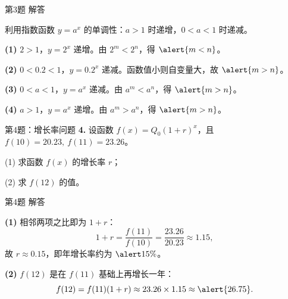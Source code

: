 \documentclass[10pt,aspectratio=169,serif,fleqn]{beamer}
\begin{document}
\begin{frame}[t]{第3题 解答}
\begin{tcolorbox}[colback=orange!10,colframe=orange,title=\textbf{解}]
利用指数函数 $y=a^{x}$ 的单调性：$a>1$ 时递增，$0<a<1$ 时递减。

\vspace{0.4em}
\textbf{(1)} $2>1$，$y=2^{x}$ 递增。由 $2^{m}<2^{n}$，得 $\alert{m<n}$。

\vspace{0.4em}
\textbf{(2)} $0<0.2<1$，$y=0.2^{x}$ 递减。函数值小则自变量大，故 $\alert{m>n}$。

\vspace{0.4em}
\textbf{(3)} $0<a<1$，$y=a^{x}$ 递减。由 $a^{m}<a^{n}$，得 $\alert{m>n}$。

\vspace{0.4em}
\textbf{(4)} $a>1$，$y=a^{x}$ 递增。由 $a^{m}>a^{n}$，得 $\alert{m>n}$。
\end{tcolorbox}
\end{frame}

\begin{frame}[t]{第4题：增长率问题}
\textbf{4.} 设函数 $f(x)=Q_{0}(1+r)^{x}$，且 $f(10)=20.23,\ f(11)=23.26$。

(1) 求函数 $f(x)$ 的增长率 $r$；

(2) 求 $f(12)$ 的值。
\end{frame}

\begin{frame}[t]{第4题 解答}
\begin{tcolorbox}[colback=orange!10,colframe=orange,title=\textbf{解}]
\textbf{(1)} 相邻两项之比即为 $1+r$：
\[
1+r=\frac{f(11)}{f(10)}=\frac{23.26}{20.23}\approx 1.15,
\]
故 $r\approx 0.15$，即年增长率约为 $\alert{15\%}$。

\vspace{0.6em}
\textbf{(2)} $f(12)$ 是在 $f(11)$ 基础上再增长一年：
\[
f(12)=f(11)(1+r)\approx 23.26\times 1.15\approx \alert{26.75}.
\]
\end{tcolorbox}
\end{frame}
\end{document}
